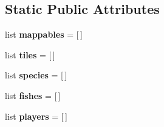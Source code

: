 \subsection*{\-Static \-Public \-Attributes}
\begin{DoxyCompactItemize}
\item 
\hypertarget{classBaseAI_1_1BaseAI_a384e2d864f84e588c2acaead20cbc843}{list {\bfseries mappables} = \mbox{[}$\,$\mbox{]}}\label{classBaseAI_1_1BaseAI_a384e2d864f84e588c2acaead20cbc843}

\item 
\hypertarget{classBaseAI_1_1BaseAI_a77618dbd239f26c10ef0b6149721bf1e}{list {\bfseries tiles} = \mbox{[}$\,$\mbox{]}}\label{classBaseAI_1_1BaseAI_a77618dbd239f26c10ef0b6149721bf1e}

\item 
\hypertarget{classBaseAI_1_1BaseAI_aa3e0fb3e1cd52d41efc09468def00bd9}{list {\bfseries species} = \mbox{[}$\,$\mbox{]}}\label{classBaseAI_1_1BaseAI_aa3e0fb3e1cd52d41efc09468def00bd9}

\item 
\hypertarget{classBaseAI_1_1BaseAI_aa8e6ddd0dcea5ad6559804f0bfba9abf}{list {\bfseries fishes} = \mbox{[}$\,$\mbox{]}}\label{classBaseAI_1_1BaseAI_aa8e6ddd0dcea5ad6559804f0bfba9abf}

\item 
\hypertarget{classBaseAI_1_1BaseAI_a7779a8279db0581d9e2df71e6a11c13f}{list {\bfseries players} = \mbox{[}$\,$\mbox{]}}\label{classBaseAI_1_1BaseAI_a7779a8279db0581d9e2df71e6a11c13f}

\end{DoxyCompactItemize}
